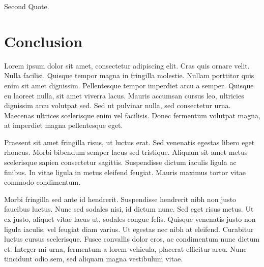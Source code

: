 \begin{savequote}[60mm]
Second Quote.
\end{savequote}

\chapter{Conclusion}

Lorem ipsum dolor sit amet, consectetur adipiscing elit. Cras quis ornare velit. Nulla facilisi. Quisque tempor magna in fringilla molestie. Nullam porttitor quis enim sit amet dignissim. Pellentesque tempor imperdiet arcu a semper. Quisque eu laoreet nulla, sit amet viverra lacus. Mauris accumsan cursus leo, ultricies dignissim arcu volutpat sed. Sed ut pulvinar nulla, sed consectetur urna. Maecenas ultrices scelerisque enim vel facilisis. Donec fermentum volutpat magna, at imperdiet magna pellentesque eget.

Praesent sit amet fringilla risus, ut luctus erat. Sed venenatis egestas libero eget rhoncus. Morbi bibendum semper lacus sed tristique. Aliquam sit amet metus scelerisque sapien consectetur sagittis. Suspendisse dictum iaculis ligula ac finibus. In vitae ligula in metus eleifend feugiat. Mauris maximus tortor vitae commodo condimentum.

Morbi fringilla sed ante id hendrerit. Suspendisse hendrerit nibh non justo faucibus luctus. Nunc sed sodales nisi, id dictum nunc. Sed eget risus metus. Ut ex justo, aliquet vitae lacus ut, sodales congue felis. Quisque venenatis justo non ligula iaculis, vel feugiat diam varius. Ut egestas nec nibh at eleifend. Curabitur luctus cursus scelerisque. Fusce convallis dolor eros, ac condimentum nunc dictum et. Integer mi urna, fermentum a lorem vehicula, placerat efficitur arcu. Nunc tincidunt odio sem, sed aliquam magna vestibulum vitae.